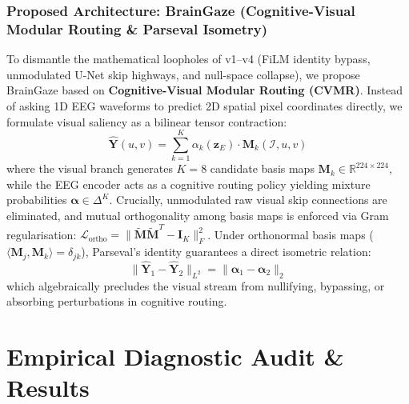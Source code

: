 \documentclass[journal,twocolumn]{IEEEtran}
\begin{document}
\subsubsection{Proposed Architecture: BrainGaze (Cognitive-Visual Modular Routing \& Parseval Isometry)}
To dismantle the mathematical loopholes of v1--v4 (FiLM identity bypass, unmodulated U-Net skip highways, and null-space collapse), we propose BrainGaze based on \textbf{Cognitive-Visual Modular Routing (CVMR)}. Instead of asking 1D EEG waveforms to predict 2D spatial pixel coordinates directly, we formulate visual saliency as a bilinear tensor contraction:
\begin{equation}
\hat{\mathbf{Y}}(u, v) = \sum_{k=1}^K \alpha_k(\mathbf{z}_E) \cdot \mathbf{M}_k(\mathcal{I}, u, v)
\end{equation}
where the visual branch generates $K=8$ candidate basis maps $\mathbf{M}_k \in \mathbb{R}^{224 \times 224}$, while the EEG encoder acts as a cognitive routing policy yielding mixture probabilities $\boldsymbol{\alpha} \in \Delta^K$. Crucially, unmodulated raw visual skip connections are eliminated, and mutual orthogonality among basis maps is enforced via Gram regularisation: $\mathcal{L}_{\text{ortho}} = \|\tilde{\mathbf{M}}\tilde{\mathbf{M}}^T - \mathbf{I}_K\|_F^2$. Under orthonormal basis maps ($\langle \mathbf{M}_j, \mathbf{M}_k \rangle = \delta_{jk}$), Parseval's identity guarantees a direct isometric relation:
\begin{equation}
\|\hat{\mathbf{Y}}_1 - \hat{\mathbf{Y}}_2\|_{L^2} = \|\boldsymbol{\alpha}_1 - \boldsymbol{\alpha}_2\|_2
\end{equation}
which algebraically precludes the visual stream from nullifying, bypassing, or absorbing perturbations in cognitive routing.

\section{Empirical Diagnostic Audit \& Results}
\end{document}
